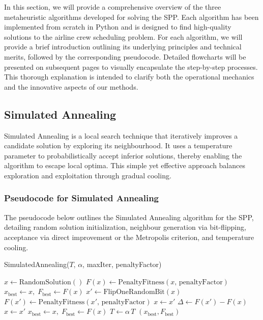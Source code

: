 \documentclass[12pt]{article}
\begin{document}
In this section, we will provide a comprehensive overview of the three metaheuristic algorithms developed for solving the SPP. Each algorithm has been implemented from scratch in Python and is designed to find high-quality solutions to the airline crew scheduling problem.
For each algorithm, we will provide a brief introduction outlining its underlying principles and technical merits, followed by the corresponding pseudocode. Detailed flowcharts will be presented on subsequent pages to visually encapsulate the step-by-step processes. 
This thorough explanation is intended to clarify both the operational mechanics and the innovative aspects of our methods. 

\subsection{Simulated Annealing}
Simulated Annealing is a local search technique that iteratively improves a candidate solution by exploring its neighbourhood. It uses a temperature parameter to probabilistically accept inferior solutions, thereby enabling the algorithm to escape local optima. 
This simple yet effective approach balances exploration and exploitation through gradual cooling.

\subsubsection{Pseudocode for Simulated Annealing}
The pseudocode below outlines the Simulated Annealing algorithm for the SPP, detailing random solution initialization, neighbour generation via bit-flipping, acceptance via direct improvement or the Metropolis criterion, and temperature cooling.

\begin{algorithm}[htbp]
  \caption{SimulatedAnnealing(\(T\), \(\alpha\), maxIter, penaltyFactor)}
  \begin{algorithmic}[1]
    \State \(x \gets \text{RandomSolution}()\) 
    \State \(F(x) \gets \text{PenaltyFitness}(x,\,\text{penaltyFactor})\)
    \State \(x_{\text{best}} \gets x,\; F_{\text{best}} \gets F(x)\)
      \State \(x' \gets \text{FlipOneRandomBit}(x)\) 
      \State \(F(x') \gets \text{PenaltyFitness}(x',\,\text{penaltyFactor})\)
        \State \(x \gets x'\) 
      \Else
        \State \(\Delta \gets F(x') - F(x)\)
          \State \(x \gets x'\) 
        \EndIf
      \EndIf
        \State \(x_{\text{best}} \gets x,\; F_{\text{best}} \gets F(x)\) 
      \EndIf
      \State \(T \gets \alpha \, T\) 
    \EndFor
    \State \Return \((x_{\text{best}}, F_{\text{best}})\)
  \end{algorithmic}
\end{algorithm}
\end{document}
